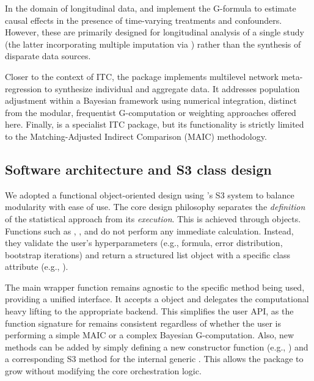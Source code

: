 \documentclass[article]{jss}
\begin{document}
In the domain of longitudinal data,  \citep{sjolander2023gformula} and  \citep{Sterne2023} implement the G-formula to estimate causal effects in the presence of time-varying treatments and confounders. However, these are primarily designed for longitudinal analysis of a single study (the latter incorporating multiple imputation via ) rather than the synthesis of disparate data sources.

Closer to the context of ITC, the  package \citep{phillippo_multinma_2020} implements multilevel network meta-regression to synthesize individual and aggregate data. It addresses population adjustment within a Bayesian framework using numerical integration, distinct from the modular, frequentist G-computation or weighting approaches offered here. Finally,  \citep{maicplus_2024} is a specialist ITC package, but its functionality is strictly limited to the Matching-Adjusted Indirect Comparison (MAIC) methodology.


\subsection{Software architecture and S3 class design}
We adopted a functional object-oriented design using 's S3 system to balance modularity with ease of use. The core design philosophy separates the \emph{definition} of the statistical approach from its \emph{execution}.
This is achieved through  objects. Functions such as , , and  do not perform any immediate calculation. Instead, they validate the user's hyperparameters (e.g., formula, error distribution, bootstrap iterations) and return a structured list object with a specific class attribute (e.g., ).

The main wrapper function  remains agnostic to the specific method being used, providing a unified interface. It accepts a  object and delegates the computational heavy lifting to the appropriate backend. This simplifies the user API, as the function signature for  remains consistent regardless of whether the user is performing a simple MAIC or a complex Bayesian G-computation. Also, new methods can be added by simply defining a new constructor function (e.g., ) and a corresponding S3 method for the internal generic . This allows the package to grow without modifying the core orchestration logic.
\end{document}
